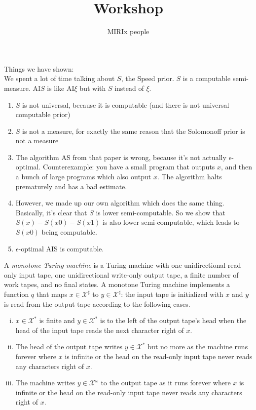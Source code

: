 \documentclass[11pt]{amsart}
\title{Workshop}
\author{MIRIx people}
\def\X{\mathcal{X}}
\begin{document}
\maketitle

Things we have shown:\\

We spent a lot of time talking about $S$, the Speed prior. $S$ is a computable semi-measure. AI$S$ is like AI$\xi$ but with $S$ instead of $\xi$.\\

\begin{enumerate}
\item $S$ is not universal, because it is computable (and there is not universal computable prior)
\item $S$ is not a measure, for exactly the same reason that the Solomonoff prior is not a measure
\item The algorithm AS from that paper is wrong, because it's not actually $\epsilon$-optimal. Counterexample: you have a small program that outputs $x$, and then a bunch of large programs which also output $x$. The algorithm halts prematurely and has a bad estimate.
\item However, we made up our own algorithm which does the same thing. Basically, it's clear that $S$ is lower semi-computable. So we show that $S(x)- S(x0) - S(x1)$ is also lower semi-computable, which leads to $S(x0)$ being computable.
\item $\epsilon$-optimal AIS is computable.
\end{enumerate}



\begin{definition}
\label{def:monotone-TM}
A \emph{monotone Turing machine}
is a Turing machine with
one unidirectional read-only input tape,
one unidirectional write-only output tape,
a finite number of work tapes, and no final states.
A monotone Turing machine implements a function $q$
that maps $x \in \X^\sharp$ to $y \in \X^\sharp$:
the input tape is initialized with $x$
and $y$ is read from the output tape according to the following cases.
\begin{enumerate}[(i)]
\item $x \in \X^*$ is finite and
	$y \in \X^*$ is to the left of the output tape's head when
	the head of the input tape reads the next character right of $x$.
\item The head of the output tape writes $y \in \X^*$ but no more
	as the machine runs forever where
	$x$ is infinite or
	the head on the read-only input tape never reads any characters right of $x$.
\item The machine writes $y \in \X^\omega$ to the output tape
	as it runs forever where
	$x$ is infinite or
	the head on the read-only input tape never reads any characters right of $x$.
\end{enumerate}
\end{definition}




\end{document}
